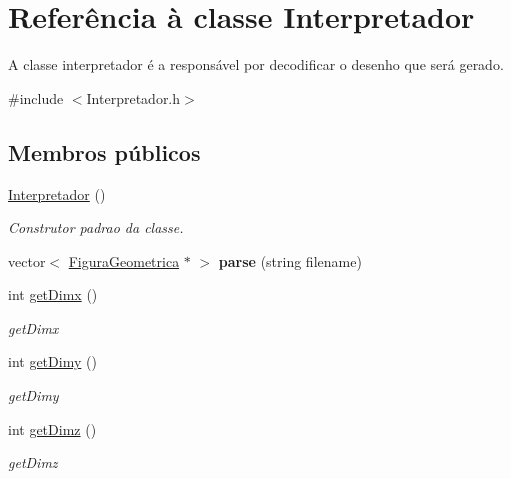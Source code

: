 \hypertarget{class_interpretador}{}\section{Referência à classe Interpretador}
\label{class_interpretador}


A classe interpretador é a responsável por decodificar o desenho que será gerado.  




{\ttfamily \#include $<$Interpretador.\+h$>$}

\subsection*{Membros públicos}
\begin{DoxyCompactItemize}
\item 
\mbox{\label{class_interpretador_a12d844a7ab8d634e96b57971c9aedd9e}} 
\hyperlink{class_interpretador_a12d844a7ab8d634e96b57971c9aedd9e}{Interpretador} ()
\begin{DoxyCompactList}\small\item\em Construtor padrao da classe. \end{DoxyCompactList}\item 
\mbox{\label{class_interpretador_aef745cb08a6b9da3eae701b46bb94297}} 
vector$<$ \hyperlink{class_figura_geometrica}{Figura\+Geometrica} $\ast$ $>$ {\bfseries parse} (string filename)
\item 
int \hyperlink{class_interpretador_a21bb78f60382699fcd32f35c9c4b6ce8}{get\+Dimx} ()
\begin{DoxyCompactList}\small\item\em get\+Dimx \end{DoxyCompactList}\item 
int \hyperlink{class_interpretador_ac76029812005ac606d0bbda805e87bfc}{get\+Dimy} ()
\begin{DoxyCompactList}\small\item\em get\+Dimy \end{DoxyCompactList}\item 
int \hyperlink{class_interpretador_a527bbdc1850ba66ef66d97aecb322576}{get\+Dimz} ()
\begin{DoxyCompactList}\small\item\em get\+Dimz \end{DoxyCompactList}\end{DoxyCompactItemize}


